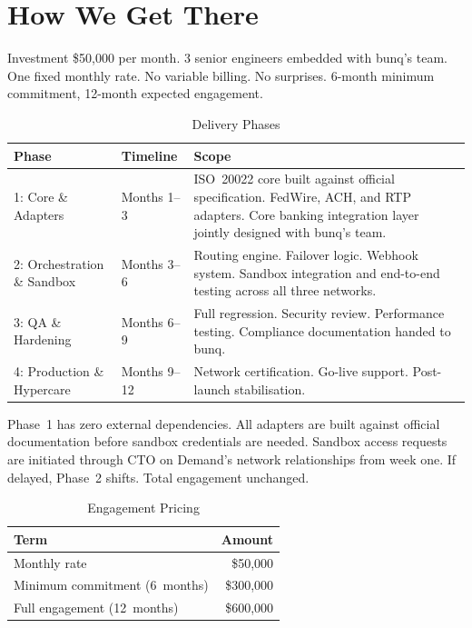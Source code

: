 
\section{How We Get There}

\begin{businessvalue}{Investment}
\$50,000 per month. 3 senior engineers embedded with bunq's team. One fixed monthly rate. No variable billing. No surprises. 6-month minimum commitment, 12-month expected engagement.
\end{businessvalue}

\begin{table}[ht]
\centering
\caption{Delivery Phases}
\begin{tabularx}{\textwidth}{@{}l l X@{}}
\toprule
\textbf{Phase} & \textbf{Timeline} & \textbf{Scope} \\
\midrule
\textsf{1: Core \& Adapters} & Months 1--3 &
  ISO~20022 core built against official specification. FedWire, ACH, and RTP adapters. Core banking integration layer jointly designed with bunq's team. \\[6pt]
\textsf{2: Orchestration \& Sandbox} & Months 3--6 &
  Routing engine. Failover logic. Webhook system. Sandbox integration and end-to-end testing across all three networks. \\[6pt]
\textsf{3: QA \& Hardening} & Months 6--9 &
  Full regression. Security review. Performance testing. Compliance documentation handed to bunq. \\[6pt]
\textsf{4: Production \& Hypercare} & Months 9--12 &
  Network certification. Go-live support. Post-launch stabilisation. \\
\bottomrule
\end{tabularx}
\end{table}

Phase~1 has zero external dependencies. All adapters are built against official documentation before sandbox credentials are needed. Sandbox access requests are initiated through CTO on Demand's network relationships from week one. If delayed, Phase~2 shifts. Total engagement unchanged.

\needspace{4cm}
\begin{table}[ht]
\centering
\caption{Engagement Pricing}
\begin{tabular}{@{}l r@{}}
\toprule
\textbf{Term} & \textbf{Amount} \\
\midrule
Monthly rate & \$50,000 \\
Minimum commitment (6~months) & \$300,000 \\
Full engagement (12~months) & \$600,000 \\
\bottomrule
\end{tabular}
\end{table}
